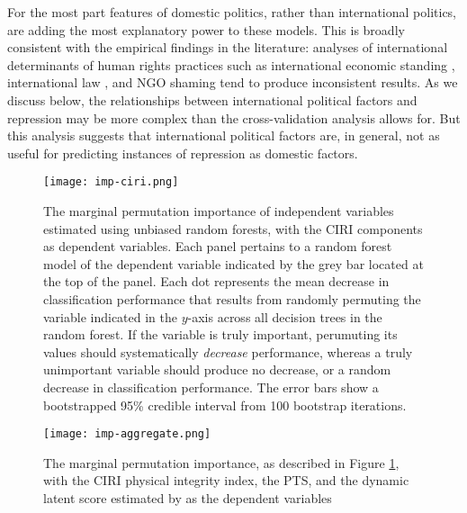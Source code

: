 \documentclass[12pt]{article}
\begin{document}
For the most part features of domestic politics, rather than international politics, are adding the most explanatory power to these models. This is broadly consistent with the empirical findings in the literature: analyses of international determinants of human rights practices such as international economic standing \citep{HafnerBurton2005jpr}, international law \citep{Keith1999,Hathaway2002,Neumayer2005,Simmons2009,PowellStaton2009,Hill2010,ConradRitter2013,Lupu2013}, and NGO shaming \citep{HafnerBurton2008,Franklin2008,MurdieDavis2012} tend to produce inconsistent results. As we discuss below, the relationships between international political factors and repression may be more complex than the cross-validation analysis allows for. But this analysis suggests that international political factors are, in general, not as useful for predicting instances of repression as domestic factors. 

\begin{figure}[!htpb]
\centering
\texttt{[image: imp-ciri.png]}
\caption{The marginal permutation importance of independent variables estimated using unbiased random forests, with the CIRI components as dependent variables. Each panel pertains to a random forest model of the dependent variable indicated by the grey bar located at the top of the panel. Each dot represents the mean decrease in classification performance that results from randomly permuting the variable indicated in the $y$-axis across all decision trees in the random forest. If the variable is truly important, perumuting its values should systematically \textit{decrease} performance, whereas a truly unimportant variable should produce no decrease, or a random decrease in classification performance. The error bars show a bootstrapped 95\% credible interval from 100 bootstrap iterations.}
\label{fig:imp-ciri}
\end{figure}

\begin{figure}[!htpb]
\centering
\texttt{[image: imp-aggregate.png]}
\caption{The marginal permutation importance, as described in Figure \ref{fig:imp-ciri}, with the CIRI physical integrity index, the PTS, and the dynamic latent score estimated by \citet{Fariss2013} as the dependent variables}
\label{fig:imp-aggregate}
\end{figure}
\end{document}
